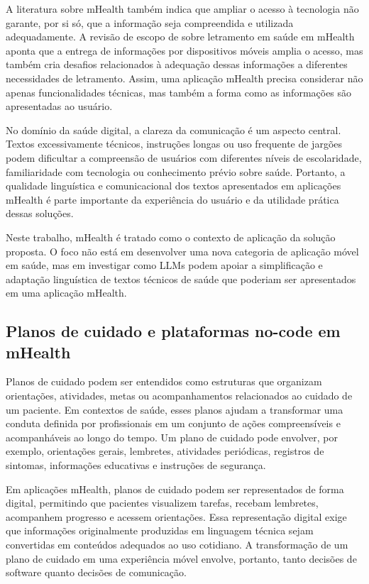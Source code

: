 A literatura sobre mHealth também indica que ampliar o acesso à tecnologia não garante, por si só, que a informação seja compreendida e utilizada adequadamente. A revisão de escopo de  sobre letramento em saúde em mHealth aponta que a entrega de informações por dispositivos móveis amplia o acesso, mas também cria desafios relacionados à adequação dessas informações a diferentes necessidades de letramento. Assim, uma aplicação mHealth precisa considerar não apenas funcionalidades técnicas, mas também a forma como as informações são apresentadas ao usuário.

No domínio da saúde digital, a clareza da comunicação é um aspecto central. Textos excessivamente técnicos, instruções longas ou uso frequente de jargões podem dificultar a compreensão de usuários com diferentes níveis de escolaridade, familiaridade com tecnologia ou conhecimento prévio sobre saúde. Portanto, a qualidade linguística e comunicacional dos textos apresentados em aplicações mHealth é parte importante da experiência do usuário e da utilidade prática dessas soluções.

Neste trabalho, mHealth é tratado como o contexto de aplicação da solução proposta. O foco não está em desenvolver uma nova categoria de aplicação móvel em saúde, mas em investigar como LLMs podem apoiar a simplificação e adaptação linguística de textos técnicos de saúde que poderiam ser apresentados em uma aplicação mHealth.

\subsection{Planos de cuidado e plataformas no-code em mHealth}
\label{sec:planos-cuidado-plataformas-nocode-mhealth}

Planos de cuidado podem ser entendidos como estruturas que organizam orientações, atividades, metas ou acompanhamentos relacionados ao cuidado de um paciente. Em contextos de saúde, esses planos ajudam a transformar uma conduta definida por profissionais em um conjunto de ações compreensíveis e acompanháveis ao longo do tempo. Um plano de cuidado pode envolver, por exemplo, orientações gerais, lembretes, atividades periódicas, registros de sintomas, informações educativas e instruções de segurança.

Em aplicações mHealth, planos de cuidado podem ser representados de forma digital, permitindo que pacientes visualizem tarefas, recebam lembretes, acompanhem progresso e acessem orientações. Essa representação digital exige que informações originalmente produzidas em linguagem técnica sejam convertidas em conteúdos adequados ao uso cotidiano. A transformação de um plano de cuidado em uma experiência móvel envolve, portanto, tanto decisões de software quanto decisões de comunicação.

